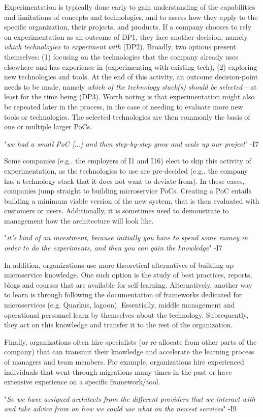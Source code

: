 \documentclass[sigconf,dvipsnames]{acmart}
\newcommand{\interviewquote}[2]{
 \def\FrameCommand{%
    \hspace{0pt}%
    {\color{MidnightBlue}\vrule width 1.5pt}%
    {\color{white}\vrule width 4pt}%
    \colorbox{white}
  }%
  \MakeFramed{\advance\hsize-\width\FrameRestore}%
  \noindent\hspace{-4.55pt}%
  \footnotesize{"\emph{#1}" -{#2}}\vspace{0.5pt}\endMakeFramed%
}
\begin{document}
Experimentation is typically done early to gain understanding of the capabilities and limitations of concepts and technologies, and to assess how they apply to the specific organization, their projects, and products.
If a company chooses to rely on experimentation as an outcome of DP1, they face another decision, namely \emph{which technologies to experiment with} (DP2). Broadly, two options present themselves: (1) focusing on the technologies that the company already uses elsewhere and has experience in (experimenting with existing tech), (2) exploring new technologies and tools.
At the end of this activity, an outcome decision-point needs to be made, namely \emph{which of the technology stack(s) should be selected} -- at least for the time being (DP3). Worth noting is that experimentation might also be repeated later in the process, in the case of needing to evaluate more new tools or technologies.
The selected technologies are then commonly the basis of one or multiple larger PoCs. 
\vspace{-0.5em}
\interviewquote{we had a small PoC [...] and then step-by-step grow and scale up our project}{I7}

Some companies (e.g., the employers of I1 and I16) elect to skip this activity of experimentation, as the technologies to use are pre-decided (e.g., the company has a technology stack that it does not want to deviate from). In these cases, companies jump straight to building microservice PoCs.
Creating a PoC entails building a minimum viable version of the new system, that is then evaluated with customers or users. 
Additionally, it is sometimes used to demonstrate to management how the architecture will look like.  
\interviewquote{it's kind of an investment, because initially you have to spend some money in order to do the experiments, and then you can gain the knowledge}{I7}

In addition, organizations use more theoretical alternatives of building up microservice knowledge. One such option is the study of best practices, reports, blogs and courses that are available for self-learning. Alternatively, another way to learn is through following the documentation of frameworks dedicated for microservices (e.g. Quarkus, lagoon).
Essentially, middle management and operational personnel learn by themselves about the technology. Subsequently, they act on this knowledge and transfer it to the rest of the organization.

Finally, organizations often hire specialists (or re-allocate from other parts of the company) that can transmit their knowledge and accelerate the learning process of managers and team members.
For example, organizations hire experienced individuals that went through migrations many times in the past or have extensive experience on a specific framework/tool.
        \interviewquote{So we have assigned architects from the different providers that we interact with and take advice from on how we could use what on the newest services}{I9}
\end{document}
